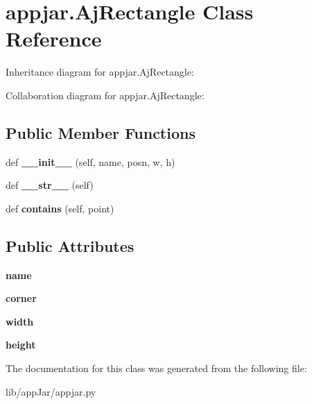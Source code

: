 \hypertarget{classappjar_1_1_aj_rectangle}{}\section{appjar.\+Aj\+Rectangle Class Reference}
\label{classappjar_1_1_aj_rectangle}


Inheritance diagram for appjar.\+Aj\+Rectangle\+:


Collaboration diagram for appjar.\+Aj\+Rectangle\+:
\subsection*{Public Member Functions}
\begin{DoxyCompactItemize}
\item 
\mbox{\label{classappjar_1_1_aj_rectangle_a0afb62dcbf06dcc0b429a0a3e8dc0e51}} 
def {\bfseries \+\_\+\+\_\+init\+\_\+\+\_\+} (self, name, posn, w, h)
\item 
\mbox{\label{classappjar_1_1_aj_rectangle_ae3a9c57ca824db48abd0f83fc56a62f0}} 
def {\bfseries \+\_\+\+\_\+str\+\_\+\+\_\+} (self)
\item 
\mbox{\label{classappjar_1_1_aj_rectangle_a3038bb8a13712da8924fda33b9615a91}} 
def {\bfseries contains} (self, point)
\end{DoxyCompactItemize}
\subsection*{Public Attributes}
\begin{DoxyCompactItemize}
\item 
\mbox{\label{classappjar_1_1_aj_rectangle_ab4401434d425db847908c1d98a84d42a}} 
{\bfseries name}
\item 
\mbox{\label{classappjar_1_1_aj_rectangle_a421ce72fcfc2ce9ce602f2024ac2dc92}} 
{\bfseries corner}
\item 
\mbox{\label{classappjar_1_1_aj_rectangle_a219a9990892700656be843004c3ee896}} 
{\bfseries width}
\item 
\mbox{\label{classappjar_1_1_aj_rectangle_a7b7a0e11d84e9a8e4a1c393ba7ffdbf7}} 
{\bfseries height}
\end{DoxyCompactItemize}


The documentation for this class was generated from the following file\+:\begin{DoxyCompactItemize}
\item 
lib/app\+Jar/appjar.\+py\end{DoxyCompactItemize}
